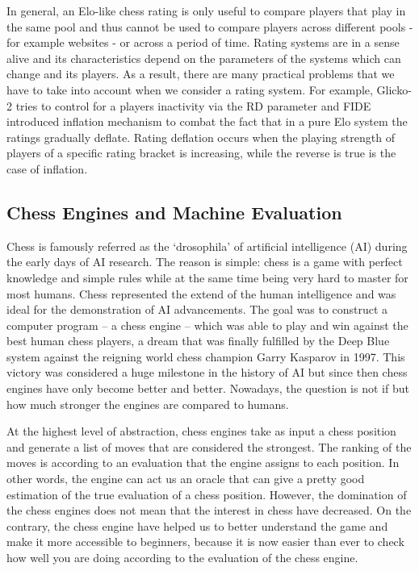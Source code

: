 \documentclass{article}
\begin{document}
In general, an Elo-like chess rating is only useful to compare players that play in the same pool and thus cannot be used to compare players across different pools - for example websites - or across a period of time. Rating systems are in a sense alive and its characteristics depend on the parameters of the systems which can change and its players. As a result, there are many practical problems that we have to take into account when we consider a rating system. For example, Glicko-2 tries to control for a players inactivity via the RD parameter and FIDE introduced inflation mechanism to combat the fact that in a pure Elo system the ratings gradually deflate. Rating deflation occurs when the playing strength of players of a specific rating bracket is increasing, while the reverse is true is the case of inflation.

\subsection{Chess Engines and Machine Evaluation}
Chess is famously referred as the ‘drosophila’ of artificial intelligence (AI) \cite{drosophilia} during the early days of AI research. The reason is simple: chess is a game with perfect knowledge and simple rules while at the same time being very hard to master for most humans. Chess represented the extend of the human intelligence and was ideal for the demonstration of AI advancements. The goal was to construct a computer program – a chess engine – which was able to play and win against the best human chess players, a dream that was finally fulfilled by the Deep Blue system against the reigning world chess champion Garry Kasparov in 1997. This victory was considered a huge milestone in the history of AI but since then chess engines have only become better and better. Nowadays, the question is not if but how much stronger the engines are compared to humans.

At the highest level of abstraction, chess engines take as input a chess position and generate a list of moves that are considered the strongest. The ranking of the moves is according to an evaluation that the engine assigns to each position. In other words, the engine can act us an oracle that can give a pretty good estimation of the true evaluation of a chess position. However, the domination of the chess engines does not mean that the interest in chess have decreased. On the contrary, the chess engine have helped us to better understand the game and make it more accessible to beginners, because it is now easier than ever to check how well you are doing according to the evaluation of the chess engine. 
\end{document}
